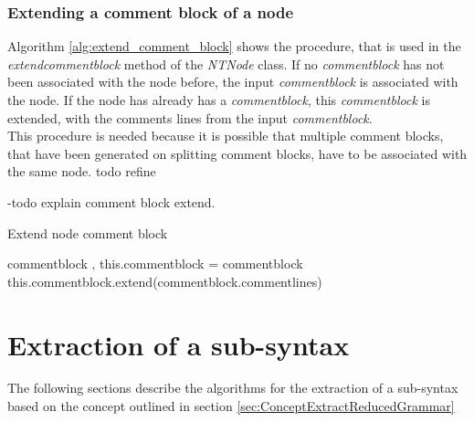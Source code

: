 \subsubsection{Extending a comment block of a node}\label{sec:ImplementationMaintainingExtendCommentBlock}

Algorithm \ref{alg:extend_comment_block} shows the procedure, that is used in the \textit{extend\textunderscore comment\textunderscore block} method of the \textit{NTNode} class.
If no \textit{comment\textunderscore block} has not been associated with the node before, the input \textit{comment\textunderscore block} is associated with the node.
If the node has already has a \textit{comment\textunderscore block}, this \textit{comment\textunderscore block} is extended, with the comments lines from the input \textit{comment\textunderscore block}.\\
This procedure is needed because it is possible that multiple comment blocks, that have been generated on splitting comment blocks, have to be associated with the same node. todo refine

-todo explain comment block extend.

\begin{algorithm}[H]
\small
\caption{Extend node comment block}
\begin{algorithmic}[1]
\algrenewcommand\algorithmicindent{0.4em}
\Require comment\textunderscore block
‚
	\State this.comment\textunderscore block = comment\textunderscore block
\Else
	\State this.comment\textunderscore block.extend(comment\textunderscore block.comment\textunderscore lines)
\EndIf
\end{algorithmic}
\label{alg:extend_comment_block}
\end{algorithm}

\section{Extraction of a sub-syntax}\label{sec:ImplementationExtractReducedGrammar}
The following sections describe the algorithms for the extraction of a sub-syntax based on the concept outlined in section \ref{sec:ConceptExtractReducedGrammar}

